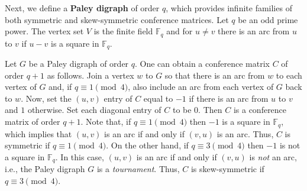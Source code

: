 \documentclass[11pt]{article}
\begin{document}
 Next, we define a \textbf{Paley digraph} of order $q$, which provides infinite families of both symmetric and skew-symmetric conference matrices.
 Let $q$ be an odd prime power.
 The vertex set $V$ is the finite field $\mathbb F_q$ and for $u \ne v$ there is an arc from $u$ to $v$ if $u - v$ is a square in $\mathbb F_q$.
 
 Let $G$ be a Paley digraph of order $q$.
 One can obtain a conference matrix $C$ of order $q+1$ as follows.
 Join a vertex $w$ to $G$ so that there is an arc from $w$ to each vertex of $G$ and, if $q \equiv 1 \pmod 4$, also include an arc from each vertex of $G$ back to $w$.
 Now, set the $(u,v)$ entry of $C$ equal to $-1$ if there is an arc from $u$ to $v$ and $1$ otherwise.
 Set each diagonal entry of $C$ to be $0$.
 Then $C$ is a conference matrix of order $q+1$.
 Note that, if $q \equiv 1 \pmod 4$ then $-1$ is a square in $\mathbb F_q$, which implies that $(u,v)$ is an arc if and only if $(v,u)$ is an arc.
 Thus, $C$ is symmetric if $q \equiv 1 \pmod 4$.
 On the other hand, if $q \equiv 3 \pmod 4$ then $-1$ is not a square in $\mathbb F_q$.
 In this case, $(u,v)$ is an arc if and only if $(v,u)$ is \emph{not} an arc, i.e., the Paley digraph $G$ is a \textit{tournament}.
 Thus, $C$ is skew-symmetric if $q \equiv 3 \pmod 4$.


\end{document}
